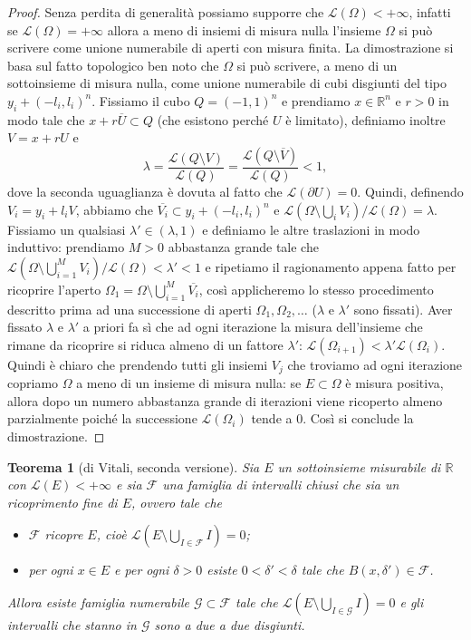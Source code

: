 \documentclass[a4paper,11pt]{book}
\theoremstyle{plain}
\newtheorem{teo}{Teorema}[chapter]
\theoremstyle{definition}
\theoremstyle{remark}
\newcommand{\R}{\mathbb{R}}
\newcommand{\LL}{\mathscr{L}}
\begin{document}
\begin{proof}
	Senza perdita di generalità possiamo supporre che $\LL(\Omega)<+\infty$, infatti se $\LL(\Omega)=+\infty$ allora a meno di insiemi di misura nulla l'insieme $\Omega$ si può scrivere come unione numerabile di aperti con misura finita. La dimostrazione si basa sul fatto topologico ben noto che $\Omega$ si può scrivere, a meno di un sottoinsieme di misura nulla, come unione numerabile di cubi disgiunti del tipo $y_{i}+(-l_{i},l_{i})^{n}$. Fissiamo il cubo $Q=(-1,1)^{n}$ e prendiamo $x\in\R^{n}$ e $r>0$ in modo tale che $x+r\overline{U}\subset Q$ (che esistono perché $U$ è limitato), definiamo inoltre $V=x+rU$ e
	\[
		\lambda=\frac{\LL(Q\setminus V)}{\LL(Q)} = \frac{\LL(Q\setminus\overline{V})}{\LL(Q)} < 1,
	\]
	dove la seconda uguaglianza è dovuta al fatto che $\LL(\partial U)=0$. Quindi, definendo $V_{i}=y_{i}+l_{i}V$, abbiamo che $\overline{V_{i}}\subset y_{i}+(-l_{i},l_{i})^{n}$ e $\LL(\Omega\setminus\bigcup_{i}V_{i})/\LL(\Omega) = \lambda$. Fissiamo un qualsiasi $\lambda'\in(\lambda,1)$ e definiamo le altre traslazioni in modo induttivo: prendiamo $M>0$ abbastanza grande tale che $\LL(\Omega\setminus\bigcup_{i=1}^{M}V_{i})/\LL(\Omega)<\lambda'<1$ e ripetiamo il ragionamento appena fatto per ricoprire l'aperto $\Omega_{1}=\Omega\setminus\bigcup_{i=1}^{M}\overline{V_{i}}$, così applicheremo lo stesso procedimento descritto prima ad una successione di aperti $\Omega_{1}, \Omega_{2},\ldots$ ($\lambda$ e $\lambda'$ sono fissati). Aver fissato $\lambda$ e $\lambda'$ a priori fa sì che ad ogni iterazione la misura dell'insieme che rimane da ricoprire si riduca almeno di un fattore $\lambda'$: $\LL(\Omega_{i+1})<\lambda'\LL(\Omega_{i})$. Quindi è chiaro che prendendo tutti gli insiemi $V_{j}$ che troviamo ad ogni iterazione copriamo $\Omega$ a meno di un insieme di misura nulla: se $E\subset \Omega$ è misura positiva, allora dopo un numero abbastanza grande di iterazioni viene ricoperto almeno parzialmente poiché la successione $\LL(\Omega_{i})$ tende a $0$. Così si conclude la dimostrazione.
\end{proof}
\begin{teo}[di Vitali, seconda versione]\label{teo:12}
	Sia $E$ un sottoinsieme misurabile di $\R$ con $\LL(E)<+\infty$ e sia $\mathcal{F}$ una famiglia di intervalli chiusi che sia un {\rm ricoprimento fine} di $E$, ovvero tale che
	\begin{itemize}
		\item $\mathcal{F}$ ricopre $E$, cioè $\LL(E\setminus\bigcup_{I\in\mathcal{F}}I)=0$;
		\item per ogni $x\in E$ e per ogni $\delta>0$ esiste $0<\delta'<\delta$ tale che $B(x,\delta')\in\mathcal{F}$.%
	\end{itemize}
	Allora esiste famiglia numerabile $\mathcal{G}\subset\mathcal{F}$ tale che $\LL(E\setminus \bigcup_{I\in\mathcal{G}}I) = 0$ e gli intervalli che stanno in $\mathcal{G}$ sono a due a due disgiunti.
\end{teo}
\end{document}
